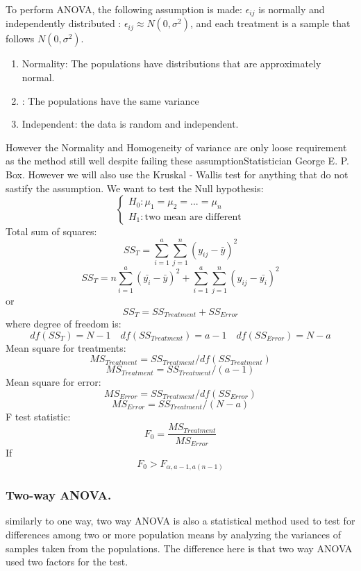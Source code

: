 To perform ANOVA, the following assumption is made: $\epsilon_{ij}$ is normally and independently 
distributed : $\epsilon_{ij} \approx N(0, \sigma^2)$, and each treatment is a sample that follows $N(0, \sigma^2)$.


\begin{enumerate}
    \item Normality: The populations have distributions that are approximately normal.
    \item   : The populations have the same variance
    \item Independent: the data is random and independent.
\end{enumerate}
However the Normality and Homogeneity of variance are only loose requirement as the method still well despite failing these assumptionStatistician George E. P. Box.
However we will also use the Kruskal - Wallis test for anything that do not sastify the assumption.
We want to test the Null hypothesis:
\[
\begin{cases}
    H_0: \mu_1 = \mu_2 = ... = \mu_n \\
    H_1: \text{two mean are different}
\end{cases}
\]
Total sum of squares:
\[ SS_T = \sum_{i = 1}^{a} \sum_{j = 1}^{n} (y_{ij} - \bar{y})^2\]
\[ SS_T = n\sum_{i=1}^{a}(\bar{y_i}-\bar{y})^2 + \sum_{i=1}^{a}\sum_{j=1}^{n}(y_{ij}-\bar{y_i})^2\]
or
\[ SS_T = SS_{Treatment}+SS_{Error}\]
where degree of freedom is:
\[df(SS_T) = N - 1 \quad df(SS_{Treatment}) = a - 1 \quad df(SS_{Error}) = N - a \]
Mean square for treatments: 
\[MS_{Treatment} = SS_{Treatment} / df(SS_{Treatment})\]
\[MS_{Treatment} = SS_{Treatment} / (a - 1)\]
Mean square for error: 
\[MS_{Error} = SS_{Treatment} / df(SS_{Error})\]
\[MS_{Error} = SS_{Treatment} / (N - a)\]   
F test statistic: 
\[F_0 = \frac{MS_{Treatment}}{MS_{Error}}\]
If \[F_0 > F_{\alpha , a-1,a(n-1)}\]

\subsubsection{Two-way ANOVA.}
similarly to one way, two way ANOVA is also a statistical method used to test for differences among two or more population means by analyzing the variances of samples taken from the populations. The difference here is that two way ANOVA used two factors for the test.



